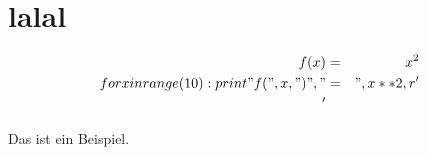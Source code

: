 \documentclass{article}
\begin{document}

\section{lalal}

\begin{eqnarray}
f(x) & = & x^2 \\
for x in range(10):
    print "f(", x, ")", " &=& ", x**2, r'\\'
\end{eqnarray}


Das ist ein Beispiel.
\end{document}
